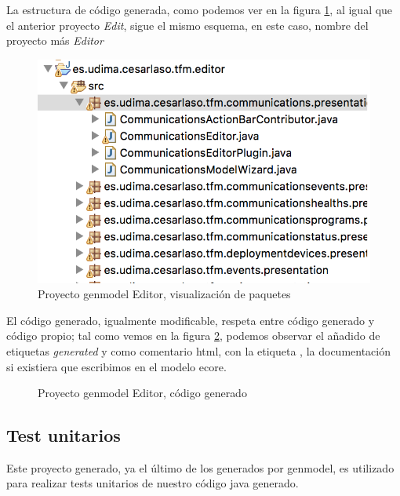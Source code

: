 La estructura de código generada, como podemos ver en la figura \ref{fig:modelo_genmodel_editor}, al igual que el anterior proyecto \textit{Edit}, sigue el mismo esquema, en este caso, nombre del proyecto más \textit{Editor}

\begin{figure}
	\centering
    \includegraphics[scale=0.4]{images/emf_capturas/genmodel_editor}
    \sourcepropia{}
    \caption{Proyecto genmodel Editor, visualización de paquetes}
    \label{fig:modelo_genmodel_editor}
\end{figure}


El código generado, igualmente modificable, respeta entre código generado y código propio; tal como vemos en la  figura \ref{fig:modelo_genmodel_editor_codigo}, podemos observar el añadido de etiquetas \textit{generated} y como comentario html, con la etiqueta  , la documentación si existiera que escribimos en el modelo \gls{ecore}.

\begin{figure}
	\centering
	
	
    \sourcepropia{}
    \caption{Proyecto genmodel Editor, código generado}
    \label{fig:modelo_genmodel_editor_codigo}
\end{figure}


\subsection{Test unitarios}

Este proyecto generado, ya el último de los generados por genmodel, es utilizado para realizar tests unitarios de nuestro código java generado.

